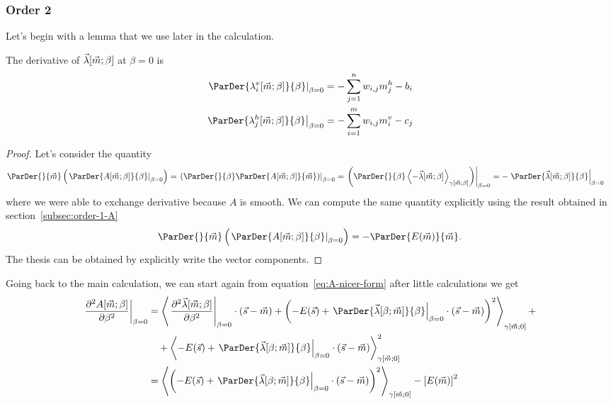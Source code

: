 \subsubsection{Order 2}
Let's begin with a lemma that we use later in the calculation.
\begin{lemma} \label{lem:first-derivative-lambda}
  The derivative of \(\vec{\lambda}{\left[\vec{m};\beta\right]}\) at \(\beta = 0\) is
  \begin{align*}
    \left.\ParDer{\lvim{\beta}}{\beta}\right|_{\beta=0} &= -\sum_{j=1}^n w_{i,j}m^h_j-b_i\\
    \left.\ParDer{\lhjm{\beta}}{\beta}\right|_{\beta=0} &= -\sum_{i=1}^m w_{i,j}m^v_i-c_j
  \end{align*}
  \begin{proof}
    Let's consider the quantity
    \begin{align*}
      \ParDer{}{\vec{m}}\left(\left.\ParDer{A{\left[\vec{m};\beta\right]}}{\beta}\right|_{\beta=0}\right)
      &= \left.\left(\ParDer{}{\beta}\ParDer{A{\left[\vec{m};\beta\right]}}{\vec{m}}\right)\right|_{\beta=0}
      = \left.\left(\ParDer{}{\beta}\Gmean{-\Lambd{\vec{m}}{\beta}}{\vec{m}}{\beta}\right)\right|_{\beta=0}
      = -\left.\ParDer{\Lambd{\vec{m}}{\beta}}{\beta}\right|_{\beta=0}
    \end{align*}
    where we were able to exchange derivative because \(A\) is smooth.
    We can compute the same quantity explicitly using the result obtained in
    section~\ref{subsec:order-1-A}
    \[
      \ParDer{}{\vec{m}}\left(\left.\ParDer{A{\left[\vec{m};\beta\right]}}{\beta}\right|_{\beta=0}\right)
      = -\ParDer{E{(\vec{m})}}{\vec{m}}.
    \]
    The thesis can be obtained by explicitly write the vector components.
  \end{proof}
\end{lemma}
Going back to the main calculation, we can start again from equation~\eqref{eq:A-nicer-form} after little calculations we get
\begin{align*}
  \left.\frac{\partial^2A{\left[\vec{m};\beta\right]}}{\partial\beta^2}\right|_{\beta=0}
  &= \Gmean{
       \left.\frac{\partial^2\vec{\lambda}{\left[\vec{m};\beta\right]}}{\partial\beta^2}\right|_{\beta=0}
         \cdot (\vec{s}-\vec{m})
       +\left(-E{(\vec{s})} +   
          \left.\ParDer{\Lambd{\beta}{\vec{m}}}{\beta}\right|_{\beta=0}\cdot(\vec{s}-\vec{m})\right)^2
     }{\vec{m}}{0}+\\
  &\quad+ \Gmean{
          -E{(\vec{s})}+\left.\ParDer{\Lambd{\beta}{\vec{m}}}{\beta}\right|_{\beta=0}\cdot(\vec{s}-\vec{m})
       }{\vec{m}}{0}^2 \\
  &= \Gmean{
       \left(-E{(\vec{s})} +   
        \left.\ParDer{\Lambd{\beta}{\vec{m}}}{\beta}\right|_{\beta=0}\cdot(\vec{s}-\vec{m})\right)^2
     }{\vec{m}}{0} - \left[E{(\vec{m})}\right]^2
\end{align*}

